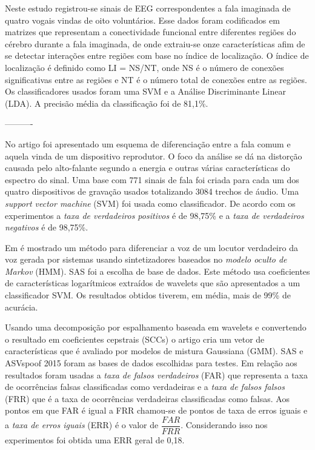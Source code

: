 \documentclass[a4paper,12pt,openright,oneside]{book}
\newenvironment{myenv}[1]
  {\begin{spacing}{#1}}
  {\end{spacing}}
\begin{document}
\begin{myenv}{1.5}
			\par Neste estudo \cite{bakhshali2022investigating} registrou-se sinais de EEG correspondentes a fala imaginada de quatro vogais vindas de oito voluntários. Esse dados foram codificados em matrizes que representam a conectividade funcional entre diferentes regiões do cérebro durante a fala imaginada, de onde extraiu-se onze características afim de se detectar interações entre regiões com base no índice de localização. O índice de localização é definido como LI = NS/NT, onde NS é o número de conexões significativas entre as regiões e NT é o número total de conexões entre as regiões. Os classificadores usados foram uma SVM e a Análise Discriminante Linear (LDA). A precisão média da classificação foi de 81,1\%.\newline
			
						
			
			\par ----------
			\par No artigo \cite{Ren2019} foi apresentado um esquema de diferenciação entre a fala comum e aquela vinda de um dispositivo reprodutor. O foco da análise se dá na distorção causada pelo alto-falante segundo a energia e outras várias características do espectro do sinal. Uma base com 771 sinais de fala foi criada para cada um dos quatro dispositivos de gravação usados totalizando 3084 trechos de áudio. Uma \textit{support vector machine} (SVM) foi usada como classificador. De  acordo com os experimentos a \textit{taxa de verdadeiros positivos} é de 98,75\% e a \textit{taxa de verdadeiros negativos} é de 98,75\%.
			
			\par Em \cite{DiqunYan2019} é mostrado um método para diferenciar a voz de um locutor verdadeiro da voz gerada por sistemas usando sintetizadores baseados no \textit{modelo oculto de Markov} (HMM). SAS\cite{SAS2019} foi a escolha de base de dados. Este método usa coeficientes de características logarítmicos extraídos de wavelets que são apresentados a um classificador SVM. Os resultados obtidos tiverem, em média, mais de 99\% de acurácia.
			
			\par Usando uma decomposição por espalhamento baseada em wavelets e convertendo o resultado em coeficientes cepstrais (SCCs) o artigo \cite{7802552} cria um vetor de características que é avaliado por modelos de mistura Gaussiana (GMM). SAS e ASVspoof 2015 \cite{ASVspoof2015} foram as bases de dados escolhidas para testes. Em relação aos resultados foram usadas a \textit{taxa de falsos verdadeiros} (FAR) que representa a taxa de ocorrências falsas classificadas como verdadeiras e a \textit{taxa de falsos falsos} (FRR) que é a taxa de ocorrências verdadeiras classificadas como falsas. Aos pontos em que FAR é igual a FRR chamou-se de pontos de taxa de erros iguais e a \textit{taxa de erros iguais} (ERR) é o valor de $\dfrac{FAR}{FRR}$. Considerando isso nos experimentos foi obtida uma ERR geral de 0,18.


\end{myenv}
\end{document}
